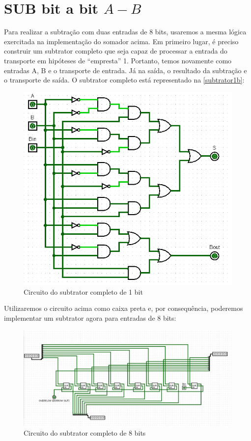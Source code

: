 \documentclass[
	12pt,				%
	openright,			%
	twoside,			%
	a4paper,			%
	english,			%
	french,				%
	spanish,			%
	brazil,				%
	]{abntex2}
\begin{document}
\section{SUB bit a bit \texorpdfstring{$A-B$}{Lg}}
Para realizar a subtração com duas entradas de 8 bits, usaremos a mesma lógica exercitada na implementação do somador acima. Em primeiro lugar, é preciso construir um subtrator completo que seja capaz de processar a entrada do transporte em hipóteses de “empresta” 1. Portanto, temos novamente como entradas A, B e o transporte de entrada. Já na saída, o resultado da subtração e o transporte de saída. O subtrator completo está representado na \autoref{subtrator1b}:

\begin{figure}[H]
	\begin{center}
	    \includegraphics[scale=0.4]{subtrator1b.png}
	\end{center}
\caption{\label{subtrator1b}Circuito do subtrator completo de 1 bit}
\end{figure}

Utilizaremos o circuito acima como caixa preta e, por consequência, poderemos implementar um subtrator agora para entradas de 8 bits:

\begin{figure}[H]
	\begin{center}
	    \includegraphics[scale=0.4]{subcircuito.png}
	\end{center}
\caption{\label{subtrator8b}Circuito do subtrator completo de 8 bits}
\end{figure}
\end{document}
